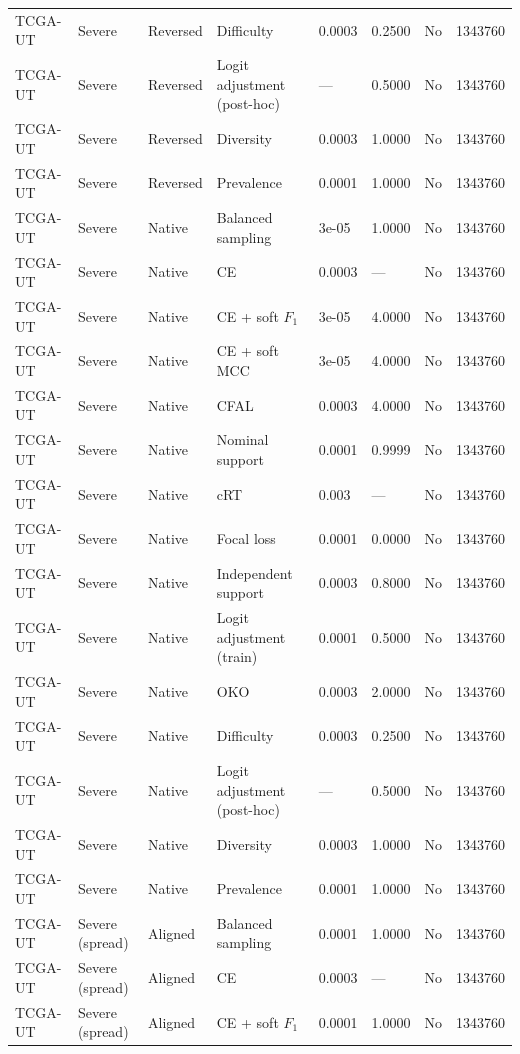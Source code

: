 \begin{longtable}{lllllllr}
TCGA-UT & Severe & Reversed & Difficulty & 0.0003 & 0.2500 & No & 1343760 \\
TCGA-UT & Severe & Reversed & Logit adjustment (post-hoc) & --- & 0.5000 & No & 1343760 \\
TCGA-UT & Severe & Reversed & Diversity & 0.0003 & 1.0000 & No & 1343760 \\
TCGA-UT & Severe & Reversed & Prevalence & 0.0001 & 1.0000 & No & 1343760 \\
TCGA-UT & Severe & Native & Balanced sampling & 3e-05 & 1.0000 & No & 1343760 \\
TCGA-UT & Severe & Native & CE & 0.0003 & --- & No & 1343760 \\
TCGA-UT & Severe & Native & CE + soft $F_1$ & 3e-05 & 4.0000 & No & 1343760 \\
TCGA-UT & Severe & Native & CE + soft MCC & 3e-05 & 4.0000 & No & 1343760 \\
TCGA-UT & Severe & Native & CFAL & 0.0003 & 4.0000 & No & 1343760 \\
TCGA-UT & Severe & Native & Nominal support & 0.0001 & 0.9999 & No & 1343760 \\
TCGA-UT & Severe & Native & cRT & 0.003 & --- & No & 1343760 \\
TCGA-UT & Severe & Native & Focal loss & 0.0001 & 0.0000 & No & 1343760 \\
TCGA-UT & Severe & Native & Independent support & 0.0003 & 0.8000 & No & 1343760 \\
TCGA-UT & Severe & Native & Logit adjustment (train) & 0.0001 & 0.5000 & No & 1343760 \\
TCGA-UT & Severe & Native & OKO & 0.0003 & 2.0000 & No & 1343760 \\
TCGA-UT & Severe & Native & Difficulty & 0.0003 & 0.2500 & No & 1343760 \\
TCGA-UT & Severe & Native & Logit adjustment (post-hoc) & --- & 0.5000 & No & 1343760 \\
TCGA-UT & Severe & Native & Diversity & 0.0003 & 1.0000 & No & 1343760 \\
TCGA-UT & Severe & Native & Prevalence & 0.0001 & 1.0000 & No & 1343760 \\
TCGA-UT & Severe (spread) & Aligned & Balanced sampling & 0.0001 & 1.0000 & No & 1343760 \\
TCGA-UT & Severe (spread) & Aligned & CE & 0.0003 & --- & No & 1343760 \\
TCGA-UT & Severe (spread) & Aligned & CE + soft $F_1$ & 0.0001 & 1.0000 & No & 1343760 \\

\end{longtable}
